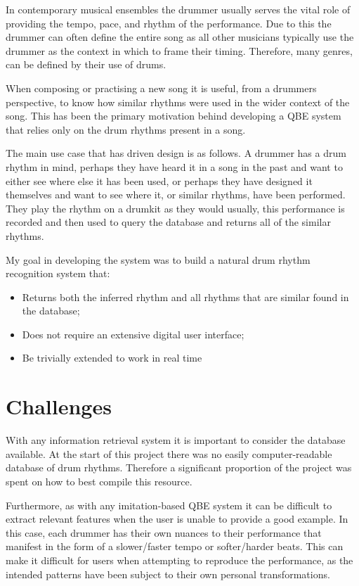 \documentclass[12pt,twoside,notitlepage]{report}
\begin{document}
	In contemporary musical ensembles the drummer usually serves the vital role of providing the tempo, pace, and rhythm of the performance. Due to this the drummer can often define the entire song as all other musicians typically use the drummer as the context in which to frame their timing. Therefore, many genres, can be defined by their use of drums.
	
	When composing or practising a new song it is useful, from a drummers perspective, to know how similar rhythms were used in the wider context of the song. This has been the primary motivation behind developing a QBE system that relies only on the drum rhythms present in a song. 
	
	The main use case that has driven design is as follows. A drummer has a drum rhythm in mind, perhaps they have heard it in a song in the past and want to either see where else it has been used, or perhaps they have designed it themselves and want to see where it, or similar rhythms, have been performed. They play the rhythm on a drumkit as they would usually, this performance is recorded and then used to query the database and returns all of the similar rhythms.
	
	My goal in developing the system was to build a natural drum rhythm recognition system that:
	\begin{itemize}
		\item{Returns both the inferred rhythm and all rhythms that are similar found in the database;}
		\item{Does not require an extensive digital user interface;}
		\item{Be trivially extended to work in real time}
	\end{itemize}	

	\section{Challenges}
	With any information retrieval system it is important to consider the database available. At the start of this project there was no easily computer-readable database of drum rhythms. Therefore a significant proportion of the project was spent on how to best compile this resource.
	
	Furthermore, as with any imitation-based QBE system it can be difficult to extract relevant features when the user is unable to provide a good example. In this case, each drummer has their own nuances to their performance that manifest in the form of a slower/faster tempo or softer/harder beats. This can make it difficult for users when attempting to reproduce the performance, as the intended patterns have been subject to their own personal transformations.
	
\end{document}
